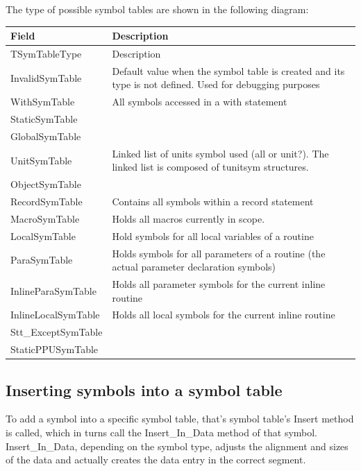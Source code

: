 \documentclass [a4paper,12pt]{article}
\begin{document}
The type of possible symbol tables are shown in the following diagram:

\begin{longtable}{|l|p{10cm}|}
\hline
Field	& Description \\
\hline
\endhead
\hline
\endfoot
TSymTableType& Description \\
\textsf{InvalidSymTable}&
	Default value when the symbol table is created and its type is not defined. Used for debugging purposes \\
\textsf{WithSymTable}&
	All symbols accessed in a with statement \\
\textsf{StaticSymTable}&  \\
\textsf{GlobalSymTable}&  \\
\textsf{UnitSymTable}&
	Linked list of units symbol used (all or unit?). The linked list is
	composed of \textsf{tunitsym} structures. \\
\textsf{ObjectSymTable}&  \\
\textsf{RecordSymTable}&
	Contains all symbols within a record statement \\
\textsf{MacroSymTable}&
	Holds all macros currently in scope. \\
\textsf{LocalSymTable}&
	Hold symbols for all local variables of a routine \\
\textsf{ParaSymTable}&
	Holds symbols for all parameters of a routine (the actual parameter declaration symbols) \\
\textsf{InlineParaSymTable}&
	Holds all parameter symbols for the current inline routine \\
\textsf{InlineLocalSymTable}&
	Holds all local symbols for the current inline routine \\
\textsf{Stt{\_}ExceptSymTable}&  \\
\textsf{StaticPPUSymTable}& 
\label{tab36}
\end{longtable}

\subsection{Inserting symbols into a symbol table}
\label{subsec:inserting}

To add a symbol into a specific symbol table, that's symbol table's
\textsf{Insert} method is called, which in turns call the
\textsf{Insert{\_}In{\_}Data} method of that symbol.
\textsf{Insert{\_}In{\_}Data}, depending on the symbol type, adjusts the
alignment and sizes of the data and actually creates the data entry in the
correct segment.
\end{document}

